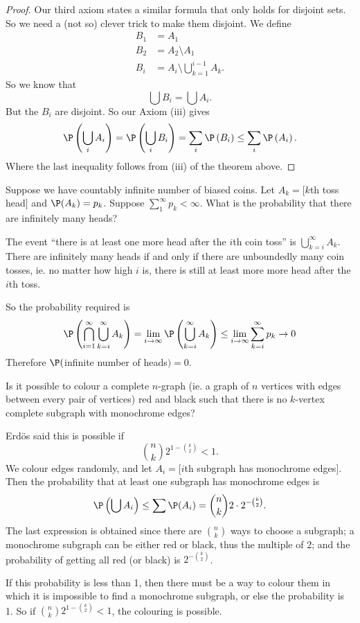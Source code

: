 \documentclass[a4paper]{article}
\begin{document}
\begin{proof}
  Our third axiom states a similar formula that only holds for disjoint sets. So we need a (not so) clever trick to make them disjoint. We define
  \begin{align*}
    B_1 &= A_1\\
    B_2 &= A_2\setminus A_1\\
    B_i &= A_i\setminus \bigcup_{k = 1}^{i - 1}A_k.
  \end{align*}
  So we know that
  \[
    \bigcup B_i = \bigcup A_i.
  \]
  But the $B_i$ are disjoint. So our Axiom (iii) gives
  \[
    \P\left(\bigcup_i A_i\right) = \P\left(\bigcup _i B_i\right) = \sum_i \P\left(B_i\right) \leq \sum_i \P\left(A_i\right).
  \]
  Where the last inequality follows from (iii) of the theorem above.
\end{proof}

\begin{eg}
  Suppose we have countably infinite number of biased coins. Let $A_k = [k$th toss head$]$ and $\P(A_k) = p_k$. Suppose $\sum_1^\infty p_k < \infty$. What is the probability that there are infinitely many heads?

  The event ``there is at least one more head after the $i$th coin toss'' is $\bigcup_{k = i}^\infty A_k$. There are infinitely many heads if and only if there are unboundedly many coin tosses, ie. no matter how high $i$ is, there is still at least more more head after the $i$th toss.

  So the probability required is
  \[
    \P\left(\bigcap_{i = 1}^\infty\bigcup _{k = i}^\infty A_k\right) = \lim_{i \to \infty} \P\left(\bigcup_{k = i}^\infty A_k\right) \leq \lim_{i\to \infty}\sum_{k = i}^\infty p_k \to 0
  \]
  Therefore $\P($infinite number of heads$) = 0$.
\end{eg}

\begin{eg}[Erdos 1947]
  Is it possible to colour a complete $n$-graph (ie. a graph of $n$ vertices with edges between every pair of vertices) red and black such that there is no $k$-vertex complete subgraph with monochrome edges?

  Erd\"os said this is possible if
  \[
    \binom{n}{k} 2^{1 - \binom{k}{2}} < 1.
  \]
  We colour edges randomly, and let $A_i=[i$th subgraph has monochrome edges$]$. Then the probability that at least one subgraph has monochrome edges is
  \[
    \P\left(\bigcup A_i\right) \leq \sum \P(A_i) = \binom{n}{k} 2\cdot 2^{-\binom{k}{2}}.
  \]
  The last expression is obtained since there are $\binom{n}{k}$ ways to choose a subgraph; a monochrome subgraph can be either red or black, thus the multiple of 2; and the probability of getting all red (or black) is $2^{-\binom{k}{2}}$.

  If this probability is less than 1, then there must be a way to colour them in which it is impossible to find a monochrome subgraph, or else the probability is 1. So if $\binom{n}{k} 2^{1 - \binom{k}{2}} < 1$, the colouring is possible.
\end{eg}
\end{document}

